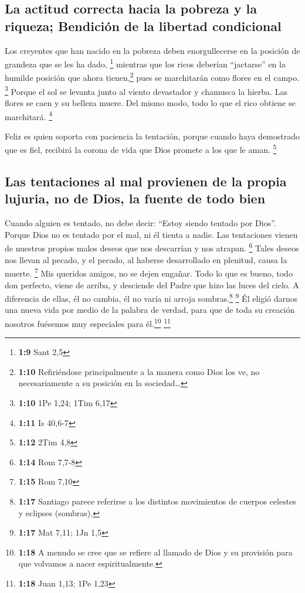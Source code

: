 \hypertarget{la-actitud-correcta-hacia-la-pobreza-y-la-riqueza-bendiciuxf3n-de-la-libertad-condicional}{%
\subsection{La actitud correcta hacia la pobreza y la riqueza; Bendición
de la libertad
condicional}\label{la-actitud-correcta-hacia-la-pobreza-y-la-riqueza-bendiciuxf3n-de-la-libertad-condicional}}

 Los creyentes que han nacido en la pobreza deben
enorgullecerse en la posición de grandeza que se les ha dado,
\footnote{\textbf{1:9} Sant 2,5}  mientras que los ricos
deberían ``jactarse'' en la humilde posición que ahora
tienen,\footnote{\textbf{1:10} Refiriéndose principalmente a la manera
  como Dios los ve, no necesariamente a su posición en la
  sociedad\ldots{}} pues se marchitarán como flores en el campo.
\footnote{\textbf{1:10} 1Pe 1,24; 1Tim 6,17}  Porque el
sol se levanta junto al viento devastador y chamusca la hierba. Las
flores se caen y su belleza muere. Del mismo modo, todo lo que el rico
obtiene se marchitará. \footnote{\textbf{1:11} Is 40,6-7}

 Feliz es quien soporta con paciencia la tentación,
porque cuando haya demostrado que es fiel, recibirá la corona de vida
que Dios promete a los que le aman. \footnote{\textbf{1:12} 2Tim 4,8}

\hypertarget{las-tentaciones-al-mal-provienen-de-la-propia-lujuria-no-de-dios-la-fuente-de-todo-bien}{%
\subsection{Las tentaciones al mal provienen de la propia lujuria, no de
Dios, la fuente de todo
bien}\label{las-tentaciones-al-mal-provienen-de-la-propia-lujuria-no-de-dios-la-fuente-de-todo-bien}}

 Cuando alguien es tentado, no debe decir: ``Estoy siendo
tentado por Dios''. Porque Dios no es tentado por el mal, ni él tienta a
nadie.  Las tentaciones vienen de nuestros propios malos
deseos que nos descarrían y nos atrapan. \footnote{\textbf{1:14} Rom
  7,7-8}  Tales deseos nos llevan al pecado, y el pecado,
al haberse desarrollado en plenitud, causa la muerte. \footnote{\textbf{1:15}
  Rom 7,10}  Mis queridos amigos, no se dejen engañar.
 Todo lo que es bueno, todo don perfecto, viene de
arriba, y desciende del Padre que hizo las luces del cielo. A diferencia
de ellas, él no cambia, él no varía ni arroja sombras.\footnote{\textbf{1:17}
  Santiago parece referirse a los distintos movimientos de cuerpos
  celestes y eclipses (sombras).} \footnote{\textbf{1:17} Mat 7,11; 1Jn
  1,5}  Él eligió darnos una nueva vida por medio de la
palabra de verdad, para que de toda su creación nosotros fuésemos muy
especiales para él.\footnote{\textbf{1:18} A menudo se cree que se
  refiere al llamado de Dios y su provisión para que volvamos a nacer
  espiritualmente.} \footnote{\textbf{1:18} Juan 1,13; 1Pe 1,23}

